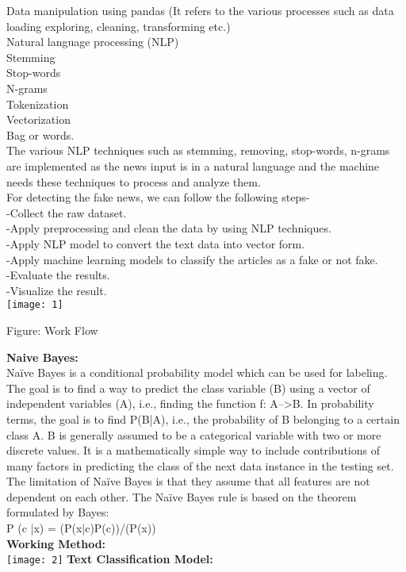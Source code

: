 \documentclass[12pt]{article}
\begin{document}
Data manipulation using pandas (It refers to the various processes such as data loading exploring, cleaning, transforming etc.)\\
Natural language processing (NLP)\\
Stemming\\
Stop-words\\
N-grams\\
Tokenization\\
Vectorization\\
Bag or words.\\
The various NLP techniques such as stemming, removing, stop-words, n-grams are implemented as the news input is in a natural language and the machine needs these techniques to process and analyze them.\\

For detecting the fake news, we can follow the following steps-\\
-Collect the raw dataset.\\
-Apply preprocessing and clean the data by using NLP techniques.\\
-Apply NLP model to convert the text data into vector form.\\
-Apply machine learning models to classify the articles as a fake or not fake.\\
-Evaluate the results.\\
-Visualize the result.\\
\texttt{[image: 1]}
\centerline{Figure: Work Flow}
\textbf{Naive Bayes:}\\
Naïve Bayes is a conditional probability model which can be used for labeling. The goal is to find a way to predict the class variable (B) using a vector of independent variables (A), i.e., finding the function f: A-->B. In probability terms, the goal is to find P(B|A), i.e., the probability of B belonging to a certain class A. B is generally assumed to be a categorical variable with two or more discrete values. It is a mathematically simple way to include contributions of many factors in predicting the class of the next data instance in the testing set. The limitation of Naïve Bayes is that they assume that all features are not dependent on each other. The Naïve Bayes rule is based on the theorem formulated by Bayes:\\
P (c |x) = (P(x|c)P(c))/(P(x))\\
\newpage
\textbf{Working Method:}\\
\texttt{[image: 2]}
\newpage
\textbf{Text Classification Model:}\\
\end{document}
